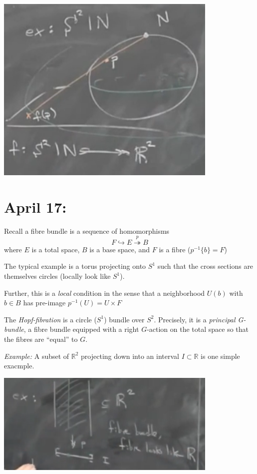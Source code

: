 \documentclass[12pt]{article}
\newcommand{\R}{\mathbb{R}}
\begin{document}
    \begin{center}
        \includegraphics[width=0.8\textwidth]{Images/April 16 - Stereographic.png}
    \end{center}

\section{April 17:}
    Recall a fibre bundle is a sequence of homomorphisms 
    \[F \hookrightarrow E \overset{p}{\twoheadrightarrow} B\] 
    where $E$ is a total space, $B$ is a base space, and $F$ is a fibre ($p^{-1}\{b\} = F$)

    The typical example is a torus projecting onto $S^1$ such that the cross sections are themselves circles (locally look like $S^1$). 

    Further, this is a \emph{local} condition in the sense that a neighborhood $U(b)$ with $b \in B$ has pre-image $p^{-1}(U) = U \times F$ 

    The \emph{Hopf-fibration} is a circle ($S^1$) bundle over $S^2$. Precisely, it is a \emph{principal G-bundle}, a fibre bundle equipped with a right $G$-action on the total space so that the fibres are ``equal'' to $G$. 

    \emph{Example:} A subset of $\R^2$ projecting down into an interval $I \subset \R$ is one simple exacmple.

    \begin{center}
        \includegraphics[width=0.8\textwidth]{Images/April 17 - R2 Hopf}
    \end{center}
\end{document}
